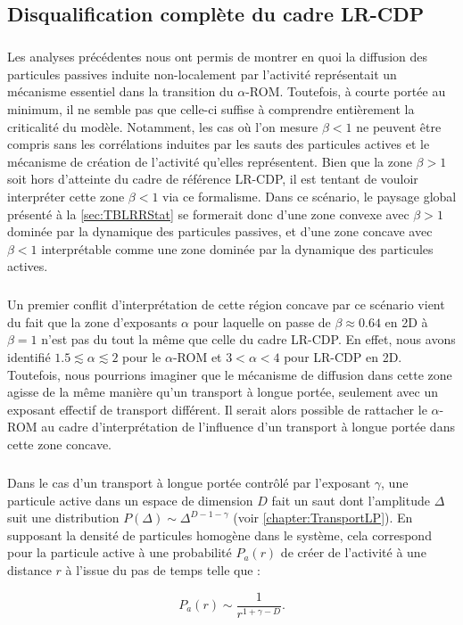 \subsection{Disqualification complète du cadre LR-CDP}

\subparagraph{}Les analyses précédentes nous ont permis de montrer en quoi la diffusion des particules passives induite non-localement par l'activité représentait un mécanisme essentiel dans la transition du $\alpha$-ROM. Toutefois, à courte portée au minimum, il ne semble pas que celle-ci suffise à comprendre entièrement la criticalité du modèle. Notamment, les cas où l'on mesure $\beta < 1$ ne peuvent être compris sans les corrélations induites par les sauts des particules actives et le mécanisme de création de l'activité qu'elles représentent. Bien que la zone $\beta >1$ soit hors d'atteinte du cadre de référence LR-CDP, il est tentant de vouloir interpréter cette zone $\beta < 1$ via ce formalisme. Dans ce scénario, le paysage global présenté à la \autoref{sec:TBLRRStat} se formerait donc d'une zone convexe avec $\beta>1$ dominée par la dynamique des particules passives, et d'une zone concave avec $\beta<1$ interprétable comme une zone dominée par la dynamique des particules actives.

\subparagraph{}Un premier conflit d'interprétation de cette région concave par ce scénario vient du fait que la zone d'exposants $\alpha$ pour laquelle on passe de $\beta\approx 0.64$ en 2D à $\beta=1$ n'est pas du tout la même que celle du cadre LR-CDP. En effet, nous avons identifié $1.5\lesssim \alpha \lesssim 2$ pour le $\alpha$-ROM et $3<\alpha<4$ pour LR-CDP en 2D. Toutefois, nous pourrions imaginer que le mécanisme de diffusion dans cette zone agisse de la même manière qu'un transport à longue portée, seulement avec un exposant effectif de transport différent. Il serait alors possible de rattacher le $\alpha$-ROM au cadre d'interprétation de l'influence d'un transport à longue portée dans cette zone concave. 

\subparagraph{}Dans le cas d'un transport à longue portée contrôlé par l'exposant $\gamma$, une particule active dans un espace de dimension $D$ fait un saut dont l'amplitude $\Delta$ suit une distribution $P(\Delta)\sim\Delta^{D-1-\gamma}$ (voir \autoref{chapter:TransportLP}). En supposant la densité de particules homogène dans le système, cela correspond pour la particule active à une probabilité $P_a(r)$ de créer de l'activité à une distance $r$ à l’issue du pas de temps telle que :

\begin{equation}
	P_a(r) \sim \frac{1}{r^{1+\gamma-D}}.
	\label{eq:sautabsoupas}
\end{equation}

